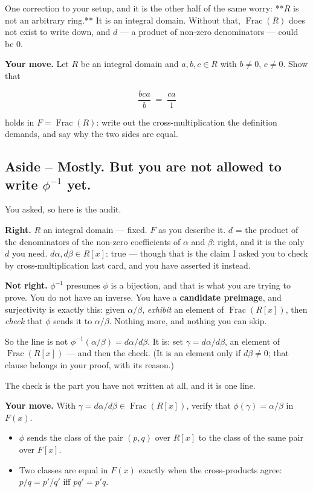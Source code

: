 \documentclass[11pt]{article}
\begin{document}
One correction to your setup, and it is the other half of the same worry: **$R$ is not an arbitrary ring.** It is an integral domain. Without that, $\operatorname{Frac}(R)$ does not exist to write down, and $d$ --- a product of non-zero denominators --- could be $0$.

\textbf{Your move.} Let $R$ be an integral domain and $a, b, c \in R$ with $b \neq 0$, $c \neq 0$. Show that

$$\frac{bca}{b} \;=\; \frac{ca}{1}$$

holds in $F = \operatorname{Frac}(R)$: write out the cross-multiplication the definition demands, and say why the two sides are equal.


\subsection*{Aside -- Mostly. But you are not allowed to write $\phi^{-1}$ yet.}
You asked, so here is the audit.

\textbf{Right.} $R$ an integral domain --- fixed. $F$ as you describe it. $d$ = the product of the denominators of the non-zero coefficients of $\alpha$ and $\beta$: right, and it is the only $d$ you need. $d\alpha, d\beta \in R[x]$: true --- though that is the claim I asked you to check by cross-multiplication last card, and you have asserted it instead.

\textbf{Not right.} $\phi^{-1}$ presumes $\phi$ is a bijection, and that is what you are trying to prove. You do not have an inverse. You have a \textbf{candidate preimage}, and surjectivity is exactly this: given $\alpha/\beta$, \emph{exhibit} an element of $\operatorname{Frac}(R[x])$, then \emph{check} that $\phi$ sends it to $\alpha/\beta$. Nothing more, and nothing you can skip.

So the line is not $\phi^{-1}(\alpha/\beta) = d\alpha/d\beta$. It is: set $\gamma = d\alpha/d\beta$, an element of $\operatorname{Frac}(R[x])$ --- and then the check. (It is an element only if $d\beta \neq 0$; that clause belongs in your proof, with its reason.)

The check is the part you have not written at all, and it is one line.

\textbf{Your move.} With $\gamma = d\alpha/d\beta \in \operatorname{Frac}(R[x])$, verify that $\phi(\gamma) = \alpha/\beta$ in $F(x)$.

\begin{itemize}
  \item $\phi$ sends the class of the pair $(p, q)$ over $R[x]$ to the class of the same pair over $F[x]$.
  \item Two classes are equal in $F(x)$ exactly when the cross-products agree: $p/q = p'/q'$ iff $pq' = p'q$.
\end{itemize}
\end{document}
